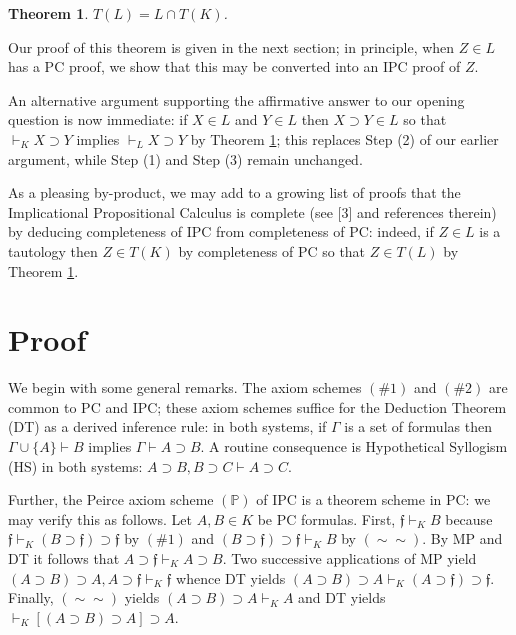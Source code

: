 \documentclass[10pt]{amsart}
\theoremstyle{plain}
\newtheorem{theorem}{Theorem}
\numberwithin{equation}{section}
\begin{document}
\medbreak 

\begin{theorem} \label{main}
$T(L) = L \cap T(K)$.
\end{theorem}

\medbreak 

Our proof of this theorem is given in the next section; in principle, when $Z \in L$ has a PC proof, we show that this may be converted into an IPC proof of $Z$. 

\medbreak 

An alternative argument supporting the affirmative answer to our opening question is now immediate: if $X \in L$ and $Y \in L$ then $X \supset Y \in L$ so that $\vdash_K X \supset Y$ implies $\vdash_L X \supset Y$ by Theorem \ref{main}; this replaces Step (2) of our earlier argument, while Step (1) and Step (3) remain unchanged. 

\medbreak 

As a pleasing by-product, we may add to a growing list of proofs that the Implicational Propositional Calculus is complete (see [3] and references therein) by deducing completeness of IPC from completeness of PC: indeed, if $Z \in L$ is a tautology then $Z \in T(K)$ by completeness of PC so that $Z \in T(L)$ by Theorem \ref{main}. 

\medbreak 

\section{Proof}

\medbreak 

We begin with some general remarks. The axiom schemes $(\#1)$ and $(\# 2)$ are common to PC and IPC; these axiom schemes suffice for the Deduction Theorem (DT) as a derived inference rule: in both systems, if $\Gamma$ is a set of formulas then $\Gamma \cup \{ A \} \vdash B$ implies $\Gamma \vdash A \supset B$. A routine consequence is Hypothetical Syllogism (HS) in both systems: $A \supset B, B \supset C \vdash A \supset C$. 

\medbreak 

Further, the Peirce axiom scheme $(\mathbb{P})$ of IPC is a theorem scheme in PC: we may verify this as follows. Let $A, B \in K$ be PC formulas. First, $\mathfrak{f} \vdash_K B$ because $\mathfrak{f} \vdash_K (B \supset \mathfrak{f}) \supset \mathfrak{f}$ by $(\#1)$ and $(B \supset \mathfrak{f}) \supset \mathfrak{f} \vdash_K B$ by $(\sim \sim)$. By MP and DT it follows that $A \supset \mathfrak{f} \vdash_K A \supset B$. Two successive applications of MP yield $(A \supset B) \supset A, A \supset \mathfrak{f} \vdash_K \mathfrak{f}$ whence DT yields $(A \supset B) \supset A \vdash_K (A \supset \mathfrak{f}) \supset \mathfrak{f}$. Finally, $(\sim \sim)$ yields $(A \supset B) \supset A \vdash_K A$ and DT yields $\vdash_K [(A \supset B) \supset A] \supset A$. 
\end{document}
